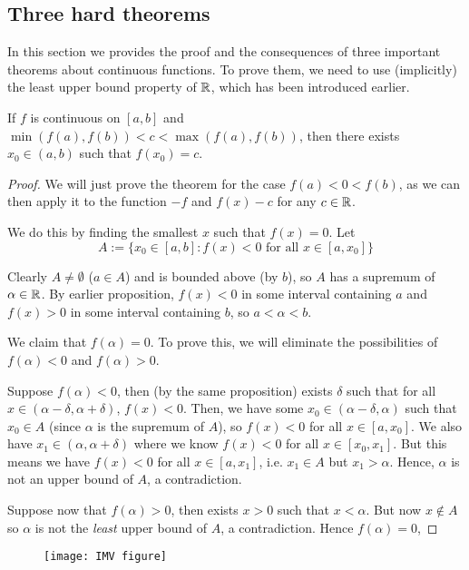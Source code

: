 \documentclass[11pt]{article}
\begin{document}
\subsection{Three hard theorems}
In this section we provides the proof and the consequences of three important theorems about continuous functions. To prove them, we need to use (implicitly) the least upper bound property of \(\mathbb{R}\), which has been introduced earlier.
\begin{theorem}
  If \(f\) is continuous on \([a,b]\) and \(\min(f(a),f(b))<c<\max(f(a),f(b))\), then there exists \(x_0\in(a,b)\) such that \(f(x_0)=c\). 
\end{theorem}
\begin{proof}
  We will just prove the theorem for the case \(f(a)<0<f(b)\), as we can then apply it to the function \(-f\) and \(f(x)-c\) for any \(c\in\mathbb{R}\).

  We do this by finding the smallest \(x\) such that \(f(x)=0\). Let
  \[A:=\{x_0\in [a,b] : f(x)<0 \text{ for all }  x\in [a,x_0]\}\]

  Clearly \(A\neq\emptyset\) (\(a\in A\)) and is bounded above (by \(b\)), so \(A\) has a supremum of \(\alpha\in\mathbb{R}\). By earlier proposition, \(f(x)<0\) in some interval containing \(a\) and \(f(x)>0\) in some interval containing \(b\), so \(a<\alpha<b\). 
  
  We claim that \(f(\alpha)=0\). To prove this, we will eliminate the possibilities of \(f(\alpha)<0\) and \(f(\alpha)>0\).

  Suppose \(f(\alpha)<0\), then (by the same proposition) exists \(\delta\) such that for all \(x\in(\alpha-\delta,\alpha+\delta)\), \(f(x)<0\). Then, we have some \(x_0\in(\alpha-\delta,\alpha)\) such that \(x_0\in A\) (since \(\alpha\) is the supremum of \(A\)), so \(f(x)<0\) for all \(x\in[a,x_0]\). We also have \(x_1\in(\alpha,\alpha+\delta)\) where we know \(f(x)<0\) for all \(x\in[x_0,x_1]\). But this means we have \(f(x)<0\) for all \(x\in[a,x_1]\), i.e. \(x_1\in A\) but \(x_1>\alpha\). Hence, \(\alpha\) is not an upper bound of \(A\), a contradiction.

  Suppose now that \(f(\alpha)>0\), then exists \(x>0\) such that \(x<\alpha\). But now \(x\notin A\) so \(\alpha\) is not the \emph{least} upper bound of \(A\), a contradiction. Hence \(f(\alpha)=0\),
\end{proof}
\begin{figure}[ht]
  \centering
  \texttt{[image: IMV figure]}
  \caption{}
\end{figure}
\end{document}
